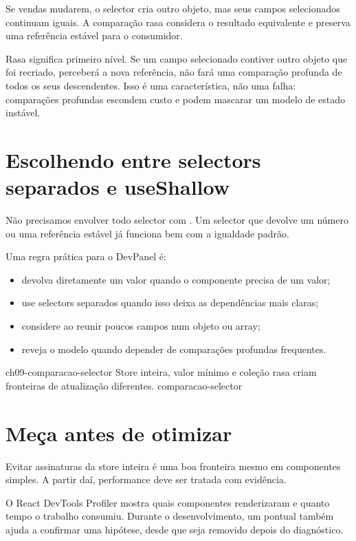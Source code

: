 Se vendas mudarem, o selector cria outro objeto, mas seus campos selecionados
continuam iguais. A comparação rasa considera o resultado equivalente e
preserva uma referência estável para o consumidor.

Rasa significa primeiro nível. Se um campo selecionado contiver outro objeto
que foi recriado,  perceberá a nova referência, não fará uma
comparação profunda de todos os seus descendentes. Isso é uma característica,
não uma falha: comparações profundas escondem custo e podem mascarar um modelo
de estado instável.

\section{Escolhendo entre selectors separados e useShallow}

Não precisamos envolver todo selector com . Um selector que
devolve um número ou uma referência estável já funciona bem com a igualdade
padrão.

Uma regra prática para o DevPanel é:

\begin{itemize}
  \item devolva diretamente um valor quando o componente precisa de um valor;
  \item use selectors separados quando isso deixa as dependências mais claras;
  \item considere  ao reunir poucos campos num objeto ou
    array;
  \item reveja o modelo quando depender de comparações profundas frequentes.
\end{itemize}

\imagemcapitulo
  {ch09-comparacao-selector}
  {Store inteira, valor mínimo e coleção rasa criam fronteiras de atualização diferentes.}
  {comparacao-selector}

\section{Meça antes de otimizar}

Evitar assinaturas da store inteira é uma boa fronteira mesmo em componentes
simples. A partir daí, performance deve ser tratada com evidência.

O React DevTools Profiler mostra quais componentes renderizaram e quanto tempo o
trabalho consumiu. Durante o desenvolvimento, um  pontual
também ajuda a confirmar uma hipótese, desde que seja removido depois do
diagnóstico.

